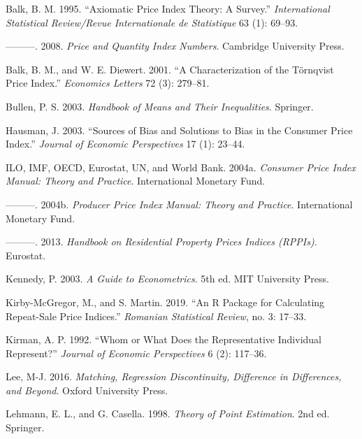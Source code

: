 \documentclass[]{article}
\begin{document}
\leavevmode\hypertarget{ref-balk1995}{}%
Balk, B. M. 1995. ``Axiomatic Price Index Theory: A Survey.'' \emph{International Statistical Review/Revue Internationale de Statistique} 63 (1): 69--93.

\leavevmode\hypertarget{ref-balk2008}{}%
---------. 2008. \emph{Price and Quantity Index Numbers}. Cambridge University Press.

\leavevmode\hypertarget{ref-balk2001}{}%
Balk, B. M., and W. E. Diewert. 2001. ``A Characterization of the Törnqvist Price Index.'' \emph{Economics Letters} 72 (3): 279--81.

\leavevmode\hypertarget{ref-bullen2003}{}%
Bullen, P. S. 2003. \emph{Handbook of Means and Their Inequalities}. Springer.

\leavevmode\hypertarget{ref-hausman2003}{}%
Hausman, J. 2003. ``Sources of Bias and Solutions to Bias in the Consumer Price Index.'' \emph{Journal of Economic Perspectives} 17 (1): 23--44.

\leavevmode\hypertarget{ref-cpimanual}{}%
ILO, IMF, OECD, Eurostat, UN, and World Bank. 2004a. \emph{Consumer Price Index Manual: Theory and Practice}. International Monetary Fund.

\leavevmode\hypertarget{ref-ppimanual}{}%
---------. 2004b. \emph{Producer Price Index Manual: Theory and Practice}. International Monetary Fund.

\leavevmode\hypertarget{ref-rppihandbook}{}%
---------. 2013. \emph{Handbook on Residential Property Prices Indices (RPPIs)}. Eurostat.

\leavevmode\hypertarget{ref-kennedy2003}{}%
Kennedy, P. 2003. \emph{A Guide to Econometrics}. 5th ed. MIT University Press.

\leavevmode\hypertarget{ref-kirbymcgregor2019}{}%
Kirby-McGregor, M., and S. Martin. 2019. ``An R Package for Calculating Repeat-Sale Price Indices.'' \emph{Romanian Statistical Review}, no. 3: 17--33.

\leavevmode\hypertarget{ref-kirman1992}{}%
Kirman, A. P. 1992. ``Whom or What Does the Representative Individual Represent?'' \emph{Journal of Economic Perspectives} 6 (2): 117--36.

\leavevmode\hypertarget{ref-lee2016}{}%
Lee, M-J. 2016. \emph{Matching, Regression Discontinuity, Difference in Differences, and Beyond}. Oxford University Press.

\leavevmode\hypertarget{ref-lehmann1998}{}%
Lehmann, E. L., and G. Casella. 1998. \emph{Theory of Point Estimation}. 2nd ed. Springer.
\end{document}
